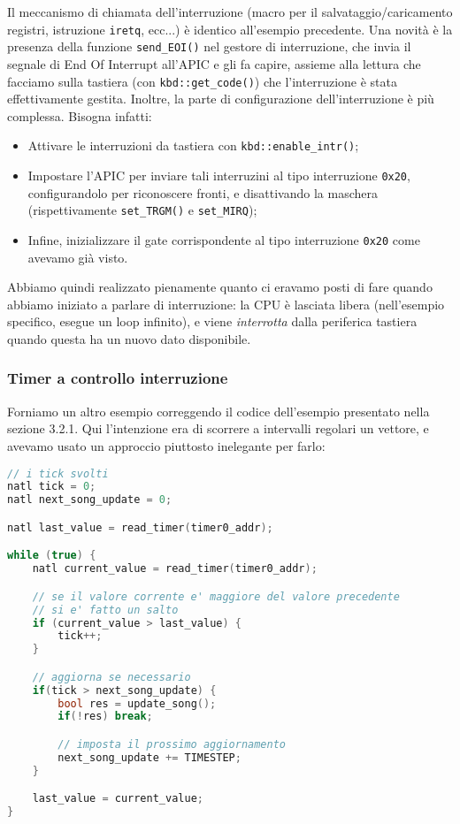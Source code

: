 \documentclass[a4paper,11pt]{article}
\begin{document}
Il meccanismo di chiamata dell'interruzione (macro per il salvataggio/caricamento registri, istruzione \lstinline|iretq|, ecc...) è identico all'esempio precedente.
Una novità è la presenza della funzione \lstinline|send_EOI()| nel gestore di interruzione, che invia il segnale di End Of Interrupt all'APIC e gli fa capire, assieme alla lettura che facciamo sulla tastiera (con \lstinline|kbd::get_code()|) che l'interruzione è stata effettivamente gestita.
Inoltre, la parte di configurazione dell'interruzione è più complessa.
Bisogna infatti:
\begin{itemize}
	\item Attivare le interruzioni da tastiera con \lstinline|kbd::enable_intr()|;
	\item Impostare l'APIC per inviare tali interruzini al tipo interruzione \lstinline|0x20|, configurandolo per riconoscere fronti, e disattivando la maschera (rispettivamente \lstinline|set_TRGM()| e \lstinline|set_MIRQ|);
	\item Infine, inizializzare il gate corrispondente al tipo interruzione \lstinline|0x20| come avevamo già visto.
\end{itemize}

Abbiamo quindi realizzato pienamente quanto ci eravamo posti di fare quando abbiamo iniziato a parlare di interruzione: la CPU è lasciata libera (nell'esempio specifico, esegue un loop infinito), e viene \textit{interrotta} dalla periferica tastiera quando questa ha un nuovo dato disponibile.

\subsubsection{Timer a controllo interruzione}

Forniamo un altro esempio correggendo il codice dell'esempio presentato nella sezione 3.2.1.
Qui l'intenzione era di scorrere a intervalli regolari un vettore, e avevamo usato un approccio piuttosto inelegante per farlo: 
\begin{lstlisting}[language=C++, style=codestyle]	
// i tick svolti
natl tick = 0;
natl next_song_update = 0;

natl last_value = read_timer(timer0_addr);

while (true) {
	natl current_value = read_timer(timer0_addr);

	// se il valore corrente e' maggiore del valore precedente 
	// si e' fatto un salto
	if (current_value > last_value) {
		tick++;
	}

	// aggiorna se necessario
	if(tick > next_song_update) {
		bool res = update_song();
		if(!res) break;

		// imposta il prossimo aggiornamento
		next_song_update += TIMESTEP;
	}

	last_value = current_value;
}
\end{lstlisting}
\end{document}
